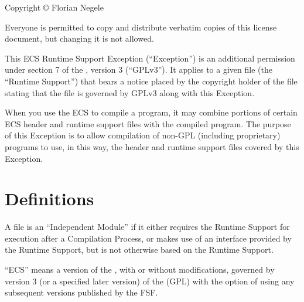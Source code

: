 






\begin{center}

Copyright \copyright{} Florian Negele

\end{center}

Everyone is permitted to copy and distribute verbatim copies of this
license document, but changing it is not allowed.

This ECS Runtime Support Exception (``Exception'') is an additional
permission under section 7 of the \gpl{}, version
3 (``GPLv3''). It applies to a given file (the ``Runtime Support'') that
bears a notice placed by the copyright holder of the file stating that
the file is governed by GPLv3 along with this Exception.

When you use the ECS to compile a program, it may combine portions of
certain ECS header and runtime support files with the compiled
program. The purpose of this Exception is to allow compilation of
non-GPL (including proprietary) programs to use, in this way, the
header and runtime support files covered by this Exception.

\setcounter{section}{-1}
\renewcommand{\thesection}{\arabic{section}.}

\section{Definitions}

A file is an ``Independent Module'' if it either requires the Runtime
Support for execution after a Compilation Process, or makes use of an
interface provided by the Runtime Support, but is not otherwise based
on the Runtime Support.

``ECS'' means a version of the \ecs{}, with or without
modifications, governed by version 3 (or a specified later version) of
the \gpl{} (GPL) with the option of using any
subsequent versions published by the FSF.

